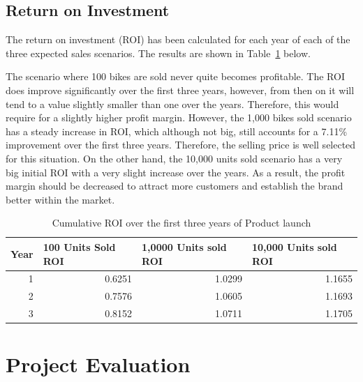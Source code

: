 \documentclass[a4paper,11pt]{article}
\begin{document}
\subsection{Return on Investment}

The return on investment (ROI) has been calculated for each year of each of the three expected sales scenarios. The results are shown in Table~\ref{tab:ROI} below. 

The scenario where 100 bikes are sold never quite becomes profitable. The ROI does improve significantly over the first three years, however, from then on it will tend to a value slightly smaller than one over the years. Therefore, this would require for a slightly higher profit margin. However, the 1,000 bikes sold scenario has a steady increase in ROI, which although not big, still accounts for a 7.11\% improvement over the first three years. Therefore, the selling price is well selected for this situation. On the other hand, the 10,000 units sold scenario has a very big initial ROI with a very slight increase over the years. As a result, the profit margin should be decreased to attract more customers and establish the brand better within the market. 

\begin{table}[!ht]
	\centering
	\caption{Cumulative ROI over the first three years of Product launch}
	\begin{tabular}{r r r r}
		\hline
		\multicolumn{1}{l}{Year}&\multicolumn{1}{l}{100 Units Sold ROI}&\multicolumn{1}{l}{1,0000 Units sold ROI}&\multicolumn{1}{l}{10,000 Units sold ROI}\\ \hline
		1&0.6251&1.0299&1.1655\\
		2&0.7576&1.0605&1.1693\\
		3&0.8152&1.0711&1.1705\\
	\end{tabular}
	\label{tab:ROI}
\end{table}

\section{Project Evaluation}


\sloppy



\nocite{shi}
\end{document}
